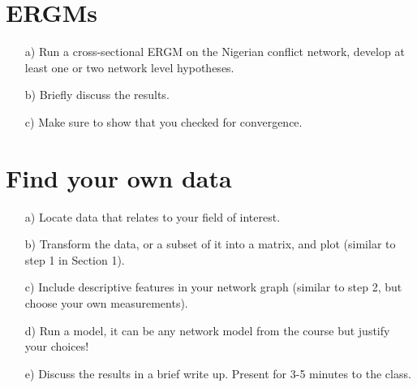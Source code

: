 \documentclass[12pt,letterpaper]{article}
\begin{document}
  


\section{ERGMs}

\begin{itemize}
	\item[a)] Run a cross-sectional ERGM on the Nigerian conflict network, develop at least one or two network level hypotheses.
	\item[b)] Briefly discuss the results.
	\item [c)] Make sure to show that you checked for convergence.
\end{itemize}

\section{Find your own data}

\begin{itemize}
	\item[a)] Locate data that relates to your field of interest.
	\item[b)] Transform the data, or a subset of it into a matrix, and plot (similar to step 1 in Section 1).
	\item [c)] Include descriptive features in your network graph (similar to step 2, but choose your own measurements).
	\item [d)] Run a model, it can be any network model from the course but justify your choices! 
	\item [e)] Discuss the results in a brief write up. Present for 3-5 minutes to the class.
\end{itemize}
\end{document}
